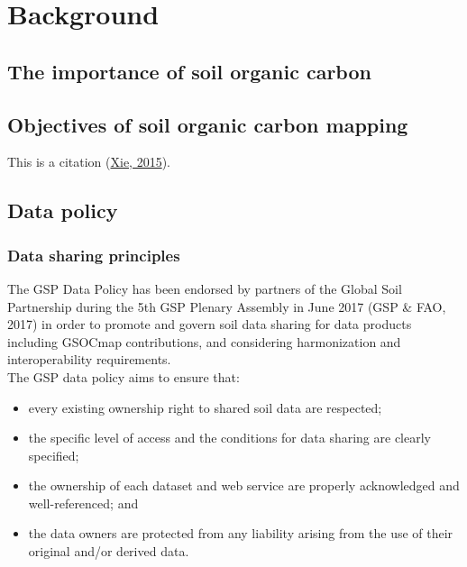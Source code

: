 \documentclass[
  10pt,
  b5paper,
  oneside]{book}
\theoremstyle{definition}
\theoremstyle{definition}
\theoremstyle{definition}
\theoremstyle{definition}
\theoremstyle{remark}
\begin{document}
\mainmatter
\pagestyle{fancy}
\setlength{\headheight}{20.39996pt}

\hypertarget{background}{%
\chapter{Background}\label{background}}

\hypertarget{the-importance-of-soil-organic-carbon}{%
\section{The importance of soil organic carbon}\label{the-importance-of-soil-organic-carbon}}

\hypertarget{objectives-of-soil-organic-carbon-mapping}{%
\section{Objectives of soil organic carbon mapping}\label{objectives-of-soil-organic-carbon-mapping}}

This is a citation (\protect\hyperlink{ref-xie2015}{Xie, 2015}).

\hypertarget{data-policy}{%
\section{Data policy}\label{data-policy}}

\hypertarget{data-sharing-principles}{%
\subsection{Data sharing principles}\label{data-sharing-principles}}

The GSP Data Policy has been endorsed by partners of the Global Soil
Partnership during the 5th GSP Plenary Assembly in June 2017
(GSP \& FAO, 2017) in order to promote and govern soil data sharing for data
products including GSOCmap contributions, and considering harmonization
and interoperability requirements.\\
The GSP data policy aims to ensure that:

\begin{itemize}
\item
  every existing ownership right to shared soil data are respected;
\item
  the specific level of access and the conditions for data sharing are
  clearly specified;
\item
  the ownership of each dataset and web service are properly
  acknowledged and well-referenced; and
\item
  the data owners are protected from any liability arising from the
  use of their original and/or derived data.
\end{itemize}
\end{document}
